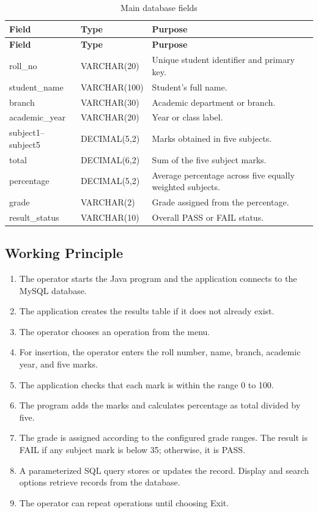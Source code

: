 \documentclass[11pt,a4paper]{report}
\begin{document}
\begin{longtable}{|p{3.4cm}|p{3.1cm}|p{7cm}|}
\caption{Main database fields}\\\hline
\textbf{Field} & \textbf{Type} & \textbf{Purpose}\\\hline
\endfirsthead
\hline \textbf{Field} & \textbf{Type} & \textbf{Purpose}\\\hline
\endhead
roll\_no & VARCHAR(20) & Unique student identifier and primary key.\\\hline
student\_name & VARCHAR(100) & Student's full name.\\\hline
branch & VARCHAR(30) & Academic department or branch.\\\hline
academic\_year & VARCHAR(20) & Year or class label.\\\hline
subject1--subject5 & DECIMAL(5,2) & Marks obtained in five subjects.\\\hline
total & DECIMAL(6,2) & Sum of the five subject marks.\\\hline
percentage & DECIMAL(5,2) & Average percentage across five equally weighted subjects.\\\hline
grade & VARCHAR(2) & Grade assigned from the percentage.\\\hline
result\_status & VARCHAR(10) & Overall PASS or FAIL status.\\\hline
\end{longtable}

\subsection{Working Principle}
\begin{enumerate}
\item The operator starts the Java program and the application connects to the MySQL database.
\item The application creates the results table if it does not already exist.
\item The operator chooses an operation from the menu.
\item For insertion, the operator enters the roll number, name, branch, academic year, and five marks.
\item The application checks that each mark is within the range 0 to 100.
\item The program adds the marks and calculates percentage as total divided by five.
\item The grade is assigned according to the configured grade ranges. The result is FAIL if any subject mark is below 35; otherwise, it is PASS.
\item A parameterized SQL query stores or updates the record. Display and search options retrieve records from the database.
\item The operator can repeat operations until choosing Exit.
\end{enumerate}
\end{document}
